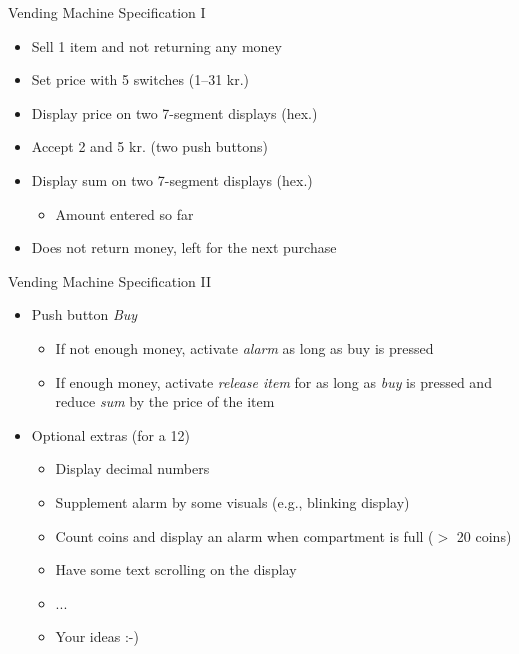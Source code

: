 \begin{frame}[fragile]{Vending Machine Specification I}
\begin{itemize}
\item Sell 1 item and not returning any money
\item Set price with 5 switches (1--31 kr.)
\item Display price on two 7-segment displays (hex.)
\item Accept 2 and 5 kr. (two push buttons)
\item Display sum on two 7-segment displays (hex.)
\begin{itemize}
\item Amount entered so far
\end{itemize}
\item Does not return money, left for the next purchase
\end{itemize}
\end{frame}

\begin{frame}[fragile]{Vending Machine Specification II}
\begin{itemize}
\item Push button \emph{Buy}
\begin{itemize}
\item If not enough money, activate \emph{alarm} as long as buy is pressed
\item If enough money, activate \emph{release item} for as long as \emph{buy}
is pressed and reduce \emph{sum} by the price of the item
\end{itemize}
\item Optional extras (for a 12)
\begin{itemize}
\item Display decimal numbers
\item Supplement alarm by some visuals (e.g., blinking display)
\item Count coins and display an alarm when compartment is full ($>$ 20 coins)
\item Have some text scrolling on the display
\item ...
\item Your ideas :-)
\end{itemize}
\end{itemize}
\end{frame}

